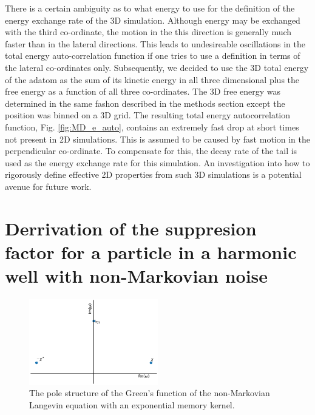 \documentclass[7pt]{article}
\begin{document}
There is a certain ambiguity as to what energy to use for the definition of the energy exchange rate of the 3D simulation. Although energy may be exchanged with the third co-ordinate, the motion in the this direction is generally much faster than in the lateral directions. This leads to undesireable oscillations in the total energy auto-correlation function if one tries to use a definition in terms of the lateral co-ordinates only. Subsequently, we decided to use the 3D total energy of the adatom as the sum of its kinetic energy in all three dimensional plus the free energy as a function of all three co-ordinates. The 3D free energy was determined in the same fashon described in the methods section except the position was binned on a 3D grid. The resulting total energy autocorrelation function, Fig. \ref{fig:MD_e_auto}, contains an extremely fast drop at short times not present in 2D simulations. This is assumed to be caused by fast motion in the perpendicular co-ordinate. To compensate for this, the decay rate of the tail is used as the energy exchange rate for this simulation. An investigation into how to rigorously define effective 2D properties from such 3D simulations is a potential avenue for future work.

\section*{Derrivation of the suppresion factor for a particle in a harmonic well with non-Markovian noise}

\begin{figure}
	\centering
	\includegraphics[width=0.5\textwidth]{F_poles}
	\caption{The pole structure of the Green's function of the non-Markovian Langevin equation with an exponential memory kernel.} 
	\label{fig:F_poles}
\end{figure}
\end{document}
